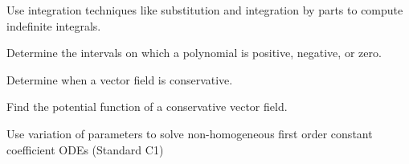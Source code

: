 \begin{readinessAssuranceOutcomes}
\item Use integration techniques like substitution and integration by parts to compute indefinite integrals. 
\item Determine the intervals on which a polynomial is positive, negative, or zero.
\item Determine when a vector field is conservative.
\item Find the potential function of a conservative vector field.
\item Use variation of parameters to solve non-homogeneous first order constant coefficient ODEs (Standard C1)
\end{readinessAssuranceOutcomes}
